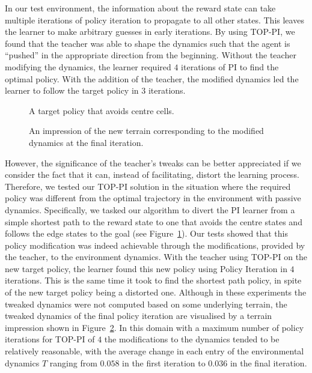 In our test environment, the information about the reward state can
take multiple iterations of policy iteration to propagate to all other
states.  This leaves the learner to make arbitrary guesses in early
iterations.  By using TOP-PI, we found that the teacher was able to
shape the dynamics such that the agent is ``pushed'' in the
appropriate direction from the beginning.  Without the teacher
modifying the dynamics, the learner required $4$ iterations of PI to
find the optimal policy.  With the addition of the teacher, the
modified dynamics led the learner to follow the target policy in $3$
iterations.

\begin{figure}[ht]
\centerline{}
\caption{\label{newopt}A target policy that avoids centre cells.}
\end{figure}

\begin{figure}[ht]
\centerline{}
\caption{\label{newalt}An impression of the new terrain corresponding to the modified dynamics at the final iteration.}
\end{figure}

However, the significance of the teacher's tweaks can be better
appreciated if we consider the fact that it can, instead of
facilitating, distort the learning process. Therefore, we tested our
TOP-PI solution in the situation where the required policy was
different from the optimal trajectory in the environment with passive
dynamics. Specifically, we tasked our algorithm to divert the PI
learner from a simple shortest path to the reward state to one that
avoids the centre states and follows the edge states to the goal (see
Figure~\ref{newopt}).  Our tests showed that this policy modification
was indeed achievable through the modifications, provided by the
teacher, to the environment dynamics.  With the teacher using TOP-PI
on the new target policy, the learner found this new policy using
Policy Iteration in $4$ iterations. This is the same time it took to
find the shortest path policy, in spite of the new target policy being
a distorted one.  Although in these experiments the tweaked dynamics
were not computed based on some underlying terrain, the tweaked
dynamics of the final policy iteration are visualised by a terrain
impression shown in Figure~\ref{newalt}. In this domain with a
maximum number of policy iterations for TOP-PI of $4$ the
modifications to the dynamics tended to be relatively reasonable, with the
average change in each entry of the environmental dynamics $T$ ranging
from $0.058$ in the first iteration to $0.036$ in the final iteration.

